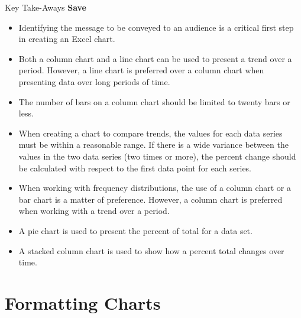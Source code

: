 \begin{center}
	\begin{tkwbox}{Key Take-Aways}
		\textbf{Save}
		\\
		\begin{itemize}
			\setlength{\itemsep}{0pt}
			\setlength{\parskip}{0pt}
			\setlength{\parsep}{0pt}
			
			\item Identifying the message to be conveyed to an audience is a critical first step in creating an Excel chart.
			\item Both a column chart and a line chart can be used to present a trend over a period. However, a line chart is preferred over a column chart when presenting data over long periods of time.
			\item The number of bars on a column chart should be limited to twenty bars or less.
			\item When creating a chart to compare trends, the values for each data series must be within a reasonable range. If there is a wide variance between the values in the two data series (two times or more), the percent change should be calculated with respect to the first data point for each series.
			\item When working with frequency distributions, the use of a column chart or a bar chart is a matter of preference. However, a column chart is preferred when working with a trend over a period.
			\item A pie chart is used to present the percent of total for a data set.
			\item A stacked column chart is used to show how a percent total changes over time.

		\end{itemize}
	\end{tkwbox}
\end{center}

\section{Formatting Charts}

